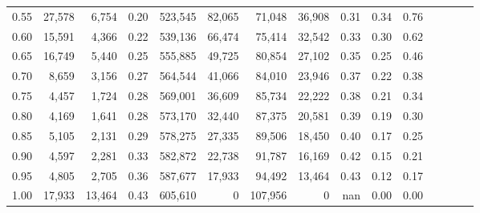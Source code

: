 \begin{tabular}{rrrcrrrrrrrrrrr}
0.55 &   27,578 &   6,754 &                                       0.20 &  523,545 &   82,065 &   71,048 &   36,908 &  0.31 &  0.34 &                         0.76 \\
0.60 &   15,591 &   4,366 &                                       0.22 &  539,136 &   66,474 &   75,414 &   32,542 &  0.33 &  0.30 &                         0.62 \\
0.65 &   16,749 &   5,440 &                                       0.25 &  555,885 &   49,725 &   80,854 &   27,102 &  0.35 &  0.25 &                         0.46 \\
0.70 &    8,659 &   3,156 &                                       0.27 &  564,544 &   41,066 &   84,010 &   23,946 &  0.37 &  0.22 &                         0.38 \\
0.75 &    4,457 &   1,724 &                                       0.28 &  569,001 &   36,609 &   85,734 &   22,222 &  0.38 &  0.21 &                         0.34 \\
0.80 &    4,169 &   1,641 &                                       0.28 &  573,170 &   32,440 &   87,375 &   20,581 &  0.39 &  0.19 &                         0.30 \\
0.85 &    5,105 &   2,131 &                                       0.29 &  578,275 &   27,335 &   89,506 &   18,450 &  0.40 &  0.17 &                         0.25 \\
0.90 &    4,597 &   2,281 &                                       0.33 &  582,872 &   22,738 &   91,787 &   16,169 &  0.42 &  0.15 &                         0.21 \\
0.95 &    4,805 &   2,705 &                                       0.36 &  587,677 &   17,933 &   94,492 &   13,464 &  0.43 &  0.12 &                         0.17 \\
1.00 &   17,933 &  13,464 &                                       0.43 &  605,610 &        0 &  107,956 &        0 &   nan &  0.00 &                         0.00 \\
\bottomrule
\end{tabular}
